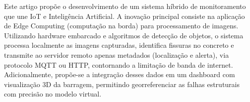Este artigo propõe o desenvolvimento de um sistema híbrido de monitoramento que une IoT e Inteligência Artificial. A inovação principal consiste na aplicação de Edge Computing (computação na borda) para processamento de imagens. Utilizando hardware embarcado e algoritmos de detecção de objetos, o sistema processa localmente as imagens capturadas, identifica fissuras no concreto e transmite ao servidor remoto apenas metadados (localização e alerta), via protocolo MQTT ou HTTP, contornando a limitação de banda de internet. Adicionalmente, propõe-se a integração desses dados em um dashboard com visualização 3D da barragem, permitindo georreferenciar as falhas estruturais com precisão no modelo virtual.
